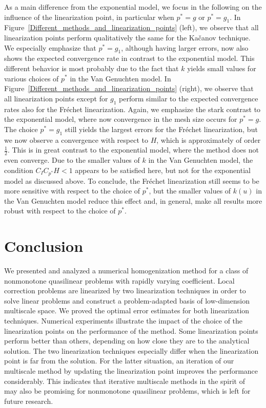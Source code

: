 \documentclass{article}
\begin{document}
As a main difference from the exponential model, we focus in the following on the influence of the linearization point, in particular when $p^*=g$ or $p^*=g_1$. In Figure~\ref{Different_methods_and_linearization_points} (left), we observe that all linearization points perform qualitatively the same for the Kačanov technique. We especially emphasize that $p^*=g_1$, although having larger errors, now also shows the expected convergence rate in contrast to the exponential model. This different behavior is most probably due to the fact that $k$ yields small values for various choices of $p^*$ in the Van Genuchten model. 
In Figure~\ref{Different_methods_and_linearization_points} (right), we observe that all linearization points except for $g_1$ perform similar to the expected convergence rates also for the Fréchet linearization. Again, we emphasize the stark contrast to the exponential model, where now convergence in the mesh size occurs for $p^*=g$. The choice $p^*=g_1$ still yields the largest errors for the Fréchet linearization, but we now observe a convergence with respect to $H$, which is approximately of order $\frac{1}{2}$. This is in great contrast to the exponential model, where the method does not even converge. Due to the smaller values of $k$ in the Van Genuchten model, the condition $C_IC_{p^*}H<1$ appears to be satisfied here, but not for the exponential model as discussed above. %
 To conclude, the Fréchet linearization still seems to be more sensitive with respect to the choice of $p^*$, but the smaller values of $k(u)$ in the Van Genuchten model reduce this effect and, in general, make all results more robust with respect to the choice of $p^*$.
% 
 \section*{Conclusion}
We presented and analyzed a numerical homogenization method for a class of nonmonotone quasilinear problems with rapidly varying coefficient. Local correction problems are linearized by two linearization techniques in order to solve linear problems and construct a problem-adapted basis of low-dimension multiscale space. We proved the optimal error estimates for both linearization techniques. Numerical experiments illustrate the impact of the choice of the linearization points on the performance of the method. Some linearization points perform better than others, depending on how close they are to the analytical solution. The two linearization techniques especially differ when the linearization point is far from the solution. For the latter situation, an iteration of our multiscale method by updating the linearization point improves the performance considerably. This indicates that iterative multiscale methods in the spirit of~\cite{MAir&barbara,IterativeLOD} may also be promising for nonmonotone quasilinear problems, which is left for future research.
 
\end{document}
